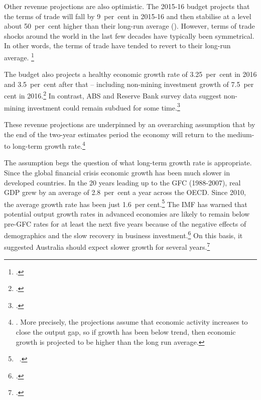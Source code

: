 \documentclass[twoside,english]{Dianab5ona4portrait}
\begin{document}
Other revenue projections are also optimistic. The 2015-16 budget projects that the terms of trade will fall by 9~per~cent in 2015-16 and then stabilise at a level about 50~per~cent higher than their long-run average (). However, terms of trade shocks around the world in the last few decades have typically been symmetrical. In other words, the terms of trade have tended to revert to their long-run average. \footcite[][34--35]{MinifieCherastidthamMullerworthEtAl2013} 


The budget also projects a healthy economic growth rate of 3.25~per~cent in 2016 and 3.5~per~cent after that – including non-mining investment growth of 7.5~per cent in 2016.\footcites[][1--7]{Treasury2015BudgetPapers201516}  In contrast, ABS and Reserve Bank survey data suggest non-mining investment could remain subdued for some time.\footcite[][38--44]{RBA2015a}  

These revenue projections are underpinned by an overarching assumption that by the end of the two-year estimates period the economy will return to the medium- to long-term growth rate.\footnote{\textcite{Treasury2014h}.  More precisely, the projections assume that economic activity increases to close the output gap, so if growth has been below trend, then economic growth is projected to be higher than the long run average.}

The assumption begs the question of what long-term growth rate is appropriate. Since the global financial crisis economic growth has been much slower in developed countries. In the 20 years leading up to the GFC (1988-2007), real GDP grew by an average of 2.8~per~cent a year across the OECD\@. Since 2010, the average growth rate has been just 1.6~per cent.\footnote{\gao\ \textcite{OECD2015a}.}  The IMF has warned that potential output growth rates in advanced economies are likely to remain below pre-GFC rates for at least the next five years because of the negative effects of demographics and the slow recovery in business investment.\footcite[][Chapter~3]{IMF2015b}  On this basis, it suggested Australia should expect slower growth for several years.\footcite{IMF2015} 
\end{document}
